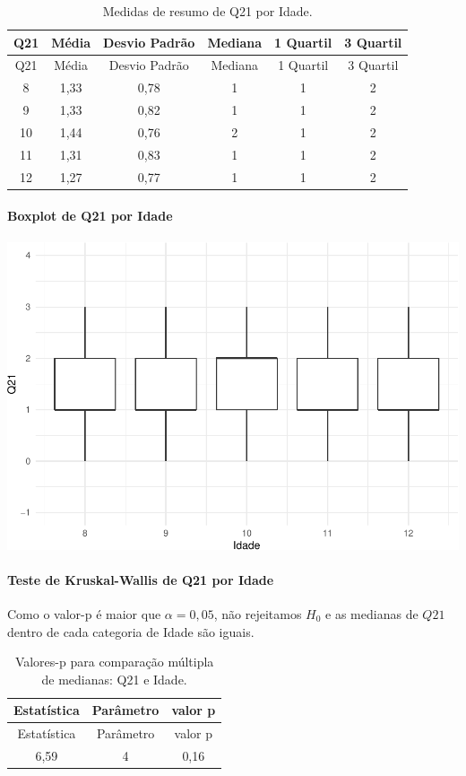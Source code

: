 \documentclass[]{article}
\let\oldparagraph\paragraph
\renewcommand{\paragraph}[1]{\oldparagraph{#1}\mbox{}}
\begin{document}
\begin{longtable}[]{@{}cccccc@{}}
\caption{\label{tab:unnamed-chunk-343}Medidas de resumo de Q21 por Idade.}\tabularnewline
\toprule
Q21 & Média & Desvio Padrão & Mediana & 1 Quartil & 3 Quartil\tabularnewline
\midrule
\endfirsthead
\toprule
Q21 & Média & Desvio Padrão & Mediana & 1 Quartil & 3 Quartil\tabularnewline
\midrule
\endhead
8 & 1,33 & 0,78 & 1 & 1 & 2\tabularnewline
9 & 1,33 & 0,82 & 1 & 1 & 2\tabularnewline
10 & 1,44 & 0,76 & 2 & 1 & 2\tabularnewline
11 & 1,31 & 0,83 & 1 & 1 & 2\tabularnewline
12 & 1,27 & 0,77 & 1 & 1 & 2\tabularnewline
\bottomrule
\end{longtable}

\hypertarget{boxplot-de-q21-por-idade}{%
\paragraph{Boxplot de Q21 por Idade}\label{boxplot-de-q21-por-idade}}

\begin{center}\includegraphics[width=0.75\linewidth]{relatorio_files/figure-latex/unnamed-chunk-344-1} \end{center}

\hypertarget{teste-de-kruskal-wallis-de-q21-por-idade}{%
\paragraph{Teste de Kruskal-Wallis de Q21 por Idade}\label{teste-de-kruskal-wallis-de-q21-por-idade}}

Como o valor-p é maior que \(\alpha=0,05\), não rejeitamos \(H_0\) e as medianas de \(Q21\) dentro de cada categoria de Idade são iguais.

\begin{longtable}[]{@{}ccc@{}}
\caption{\label{tab:unnamed-chunk-345}Valores-p para comparação múltipla de medianas: Q21 e Idade.}\tabularnewline
\toprule
Estatística & Parâmetro & valor p\tabularnewline
\midrule
\endfirsthead
\toprule
Estatística & Parâmetro & valor p\tabularnewline
\midrule
\endhead
6,59 & 4 & 0,16\tabularnewline
\bottomrule
\end{longtable}
\end{document}
